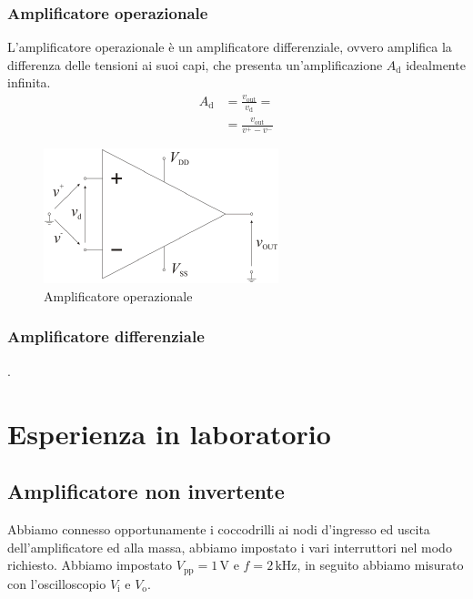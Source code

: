 \documentclass[a4paper]{article}
\begin{document}
			\subsubsection{Amplificatore operazionale}
				L'amplificatore operazionale è un amplificatore differenziale, ovvero amplifica la differenza delle tensioni ai suoi capi, che presenta un'amplificazione $ A_{\mathrm{d}} $ idealmente infinita.
				\begin{equation*}
					\begin{split}
						A_{\mathrm{d}} &= \frac{v_{\mathrm{out}}}{v_{\mathrm{d}}} = \\
						&= \frac{v_{\mathrm{out}}}{v^{+} - v^{-}}
					\end{split}
				\end{equation*}
				\begin{figure}[h!]
					\centering
					\includegraphics[scale=0.7]{amplificatoreOperazionale}
					\caption{Amplificatore operazionale}
					\label{fig:amplificatoreOperazionale}
				\end{figure}
			\subsubsection{Amplificatore differenziale}
				.
	\section{Esperienza in laboratorio}
		\subsection{Amplificatore non invertente}
			Abbiamo connesso opportunamente i coccodrilli ai nodi d'ingresso ed uscita dell'amplificatore ed alla massa, abbiamo impostato i vari interruttori nel modo richiesto.
			\newline
			Abbiamo impostato $ V_{\mathrm{pp}} = 1 \, \mathrm{V} $ e $ f = 2 \, \mathrm{kHz} $, in seguito abbiamo misurato con l'oscilloscopio $ V_{\mathrm{i}} $ e $ V_{\mathrm{o}} $.
\end{document}

